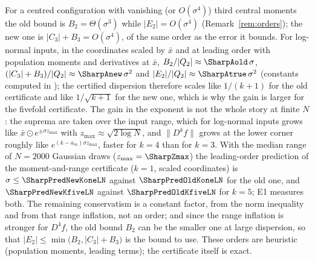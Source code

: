 \begin{remark}\label{rem:sharporders}
For a centred configuration with vanishing (or $O(\sigma^4)$) third central moments the old bound is $B_2=\Theta(\sigma^3)$ while $|E_2|=O(\sigma^4)$ (Remark~\ref{rem:orders}); the new one is $|C_3|+B_3=O(\sigma^4)$, of the same order as the error it bounds. For log-normal inputs, in the coordinates scaled by $\bar x$ and at leading order with population moments and derivatives at $\bar x$, $B_2/|Q_2|\approx\SharpAold\,\sigma$, $(|C_3|+B_3)/|Q_2|\approx\SharpAnew\,\sigma^2$ and $|E_2|/|Q_2|\approx\SharpAtrue\,\sigma^2$ (constants computed in ); the certified dispersion therefore scales like $1/(k+1)$ for the old certificate and like $1/\sqrt{k+1}$ for the new one, which is why the gain is larger for the fivefold certificate. The gain in the exponent is not the whole story at finite $N$: the suprema are taken over the input range, which for log-normal inputs grows like $\bar x\odot e^{\pm\sigma z_{\max}}$ with $z_{\max}\approx\sqrt{2\log N}$, and $\|D^k\!f\|$ grows at the lower corner roughly like $e^{(k-a_m)\sigma z_{\max}}$, faster for $k=4$ than for $k=3$. With the median range of $N=2000$ Gaussian draws ($z_{\max}=\SharpZmax$) the leading-order prediction of the moment-and-range certificate ($k=1$, scaled coordinates) is $\sigma\le\SharpPredNewKoneLN$ against $\SharpPredOldKoneLN$ for the old one, and $\SharpPredNewKfiveLN$ against $\SharpPredOldKfiveLN$ for $k=5$; E1 measures both. The remaining conservatism is a constant factor, from the norm inequality and from that range inflation, not an order; and since the range inflation is stronger for $D^4\!f$, the old bound $B_2$ can be the smaller one at large dispersion, so that $|E_2|\le\min\big(B_2,|C_3|+B_3\big)$ is the bound to use. These orders are heuristic (population moments, leading terms); the certificate itself is exact.
\end{remark}

